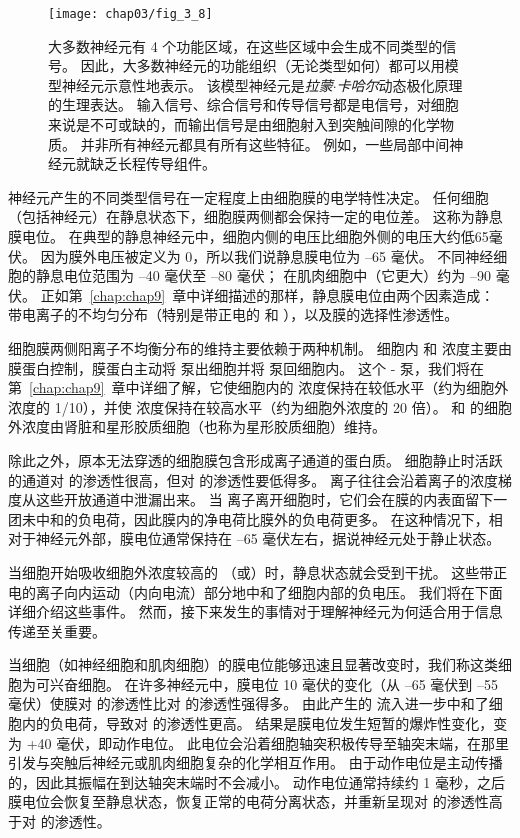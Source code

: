 \begin{figure}[htbp]
	\centering
	\texttt{[image: chap03/fig\_3\_8]}
	\caption{大多数神经元有 4 个功能区域，在这些区域中会生成不同类型的信号。
		因此，大多数神经元的功能组织（无论类型如何）都可以用模型神经元示意性地表示。
		该模型神经元是\textit{拉蒙$\cdot$卡哈尔}动态极化原理的生理表达。 
		输入信号、综合信号和传导信号都是电信号，对细胞来说是不可或缺的，而输出信号是由细胞射入到突触间隙的化学物质。
		并非所有神经元都具有所有这些特征。 
		例如，一些局部中间神经元就缺乏长程传导组件。}
	\label{fig:3_8}
\end{figure}


神经元产生的不同类型信号在一定程度上由细胞膜的电学特性决定。
任何细胞（包括神经元）在静息状态下，细胞膜两侧都会保持一定的电位差。
这称为静息膜电位。 
在典型的静息神经元中，细胞内侧的电压比细胞外侧的电压大约低65毫伏。
因为膜外电压被定义为 0，所以我们说静息膜电位为 –65 毫伏。
不同神经细胞的静息电位范围为 –40 毫伏至 –80 毫伏； 
在肌肉细胞中（它更大）约为 –90 毫伏。
正如第~\ref{chap:chap9}~章中详细描述的那样，静息膜电位由两个因素造成：
带电离子的不均匀分布（特别是带正电的  和 ），以及膜的选择性渗透性。


细胞膜两侧阳离子不均衡分布的维持主要依赖于两种机制。
细胞内  和  浓度主要由膜蛋白控制，膜蛋白主动将  泵出细胞并将  泵回细胞内。 
这个 - 泵，我们将在第~\ref{chap:chap9}~章中详细了解，它使细胞内的  浓度保持在较低水平（约为细胞外浓度的 1/10），并使  浓度保持在较高水平（约为细胞外浓度的 20 倍）。
 和  的细胞外浓度由肾脏和星形胶质细胞（也称为星形胶质细胞）维持。


除此之外，原本无法穿透的细胞膜包含形成离子通道的蛋白质。
细胞静止时活跃的通道对  的渗透性很高，但对  的渗透性要低得多。 
 离子往往会沿着离子的浓度梯度从这些开放通道中泄漏出来。 
当  离子离开细胞时，它们会在膜的内表面留下一团未中和的负电荷，因此膜内的净电荷比膜外的负电荷更多。 
在这种情况下，相对于神经元外部，膜电位通常保持在 –65 毫伏左右，据说神经元处于静止状态。


当细胞开始吸收细胞外浓度较高的 （或）时，静息状态就会受到干扰。
这些带正电的离子向内运动（内向电流）部分地中和了细胞内部的负电压。 
我们将在下面详细介绍这些事件。 
然而，接下来发生的事情对于理解神经元为何适合用于信息传递至关重要。


当细胞（如神经细胞和肌肉细胞）的膜电位能够迅速且显著改变时，我们称这类细胞为可兴奋细胞。 
在许多神经元中，膜电位 10 毫伏的变化（从 –65 毫伏到 –55 毫伏）使膜对  的渗透性比对  的渗透性强得多。 
由此产生的  流入进一步中和了细胞内的负电荷，导致对  的渗透性更高。 
结果是膜电位发生短暂的爆炸性变化，变为 +40 毫伏，即动作电位。 
此电位会沿着细胞轴突积极传导至轴突末端，在那里引发与突触后神经元或肌肉细胞复杂的化学相互作用。 
由于动作电位是主动传播的，因此其振幅在到达轴突末端时不会减小。 
动作电位通常持续约 1 毫秒，之后膜电位会恢复至静息状态，恢复正常的电荷分离状态，并重新呈现对  的渗透性高于对  的渗透性。


